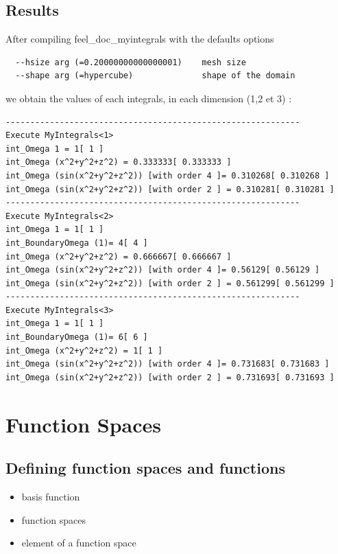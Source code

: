 \subsection{Results}

After compiling feel\_doc\_myintegrals with the defaults options
\begin{lstlisting}
  --hsize arg (=0.20000000000000001)    mesh size
  --shape arg (=hypercube)              shape of the domain
\end{lstlisting}
\vspace{0.2cm}
we obtain the values of each integrals, in each dimension (1,2 et 3) : \\
\begin{lstlisting}
------------------------------------------------------------
Execute MyIntegrals<1>
int_Omega 1 = 1[ 1 ]
int_Omega (x^2+y^2+z^2) = 0.333333[ 0.333333 ]
int_Omega (sin(x^2+y^2+z^2)) [with order 4 ]= 0.310268[ 0.310268 ]
int_Omega (sin(x^2+y^2+z^2)) [with order 2 ] = 0.310281[ 0.310281 ]
------------------------------------------------------------
Execute MyIntegrals<2>
int_Omega 1 = 1[ 1 ]
int_BoundaryOmega (1)= 4[ 4 ]
int_Omega (x^2+y^2+z^2) = 0.666667[ 0.666667 ]
int_Omega (sin(x^2+y^2+z^2)) [with order 4 ]= 0.56129[ 0.56129 ]
int_Omega (sin(x^2+y^2+z^2)) [with order 2 ] = 0.561299[ 0.561299 ]
------------------------------------------------------------
Execute MyIntegrals<3>
int_Omega 1 = 1[ 1 ]
int_BoundaryOmega (1)= 6[ 6 ]
int_Omega (x^2+y^2+z^2) = 1[ 1 ]
int_Omega (sin(x^2+y^2+z^2)) [with order 4 ]= 0.731683[ 0.731683 ]
int_Omega (sin(x^2+y^2+z^2)) [with order 2 ] = 0.731693[ 0.731693 ]
\end{lstlisting}


\section{Function Spaces}
\label{sec:function-spaces}

\subsection{Defining function spaces and functions}

\begin{itemize}
\item basis function
\item function spaces
\item element of a function space
\end{itemize}

